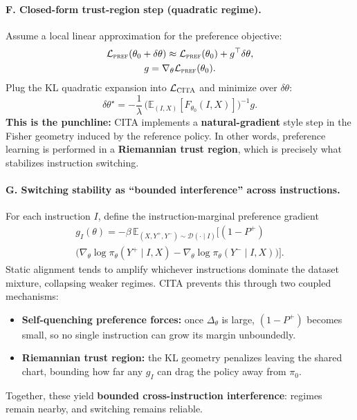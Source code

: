 \vspace{-0.35em}
\paragraph{\textbf{F. Closed-form trust-region step (quadratic regime).}}
Assume a local linear approximation for the preference objective:
\begin{gather*}
\mathcal{L}_{\textsc{pref}}(\theta_0+\delta\theta)
\approx
\mathcal{L}_{\textsc{pref}}(\theta_0)+g^\top\delta\theta,\\
g=\nabla_\theta\mathcal{L}_{\textsc{pref}}(\theta_0).
\end{gather*}
Plug the KL quadratic expansion into $\mathcal{L}_{\textsc{CITA}}$ and minimize over $\delta\theta$:
\[
\delta\theta^\star
=
-\frac{1}{\lambda}\,
\Big(\mathbb{E}_{(I,X)}[F_{\theta_0}(I,X)]\Big)^{-1}g.
\]
\textbf{This is the punchline:} CITA implements a \textbf{natural-gradient} style step in the Fisher geometry induced by the reference policy. In other words, preference learning is performed in a \textbf{Riemannian trust region}, which is precisely what stabilizes instruction switching.

\vspace{-0.35em}
\paragraph{\textbf{G. Switching stability as ``bounded interference'' across instructions.}}
For each instruction $I$, define the instruction-marginal preference gradient
{\footnotesize
\begin{multline*}
g_I(\theta)
=
-\beta\,
\mathbb{E}_{(X,Y^+,Y^-)\sim\mathcal{D}(\cdot\mid I)}
\Big[(1-P^+)\\
\big(
\nabla_\theta\log\pi_\theta(Y^+\mid I,X)
-\nabla_\theta\log\pi_\theta(Y^-\mid I,X)
\big)
\Big].
\end{multline*}
}
Static alignment tends to amplify whichever instructions dominate the dataset mixture, collapsing weaker regimes.
CITA prevents this through two coupled mechanisms:
\begin{itemize}
\item \textbf{Self-quenching preference forces:} once $\Delta_\theta$ is large, $(1-P^+)$ becomes small, so no single instruction can grow its margin unboundedly.
\item \textbf{Riemannian trust region:} the KL geometry penalizes leaving the shared chart, bounding how far any $g_I$ can drag the policy away from $\pi_0$.
\end{itemize}
Together, these yield \textbf{bounded cross-instruction interference}: regimes remain nearby, and switching remains reliable.

